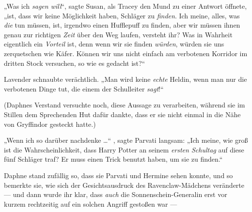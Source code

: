 „Was ich \emph{sagen will}“, sagte Susan, als Tracey den Mund zu einer Antwort öffnete, „ist, dass wir keine Möglichkeit haben, Schläger zu \emph{finden}. Ich meine, alles, was \emph{die} tun müssen, ist, irgendwo einen Hufflepuff zu finden, aber wir müssen ihnen genau zur richtigen \emph{Zeit} über den Weg laufen, versteht ihr? Was in Wahrheit eigentlich ein \emph{Vorteil} ist, denn wenn wir sie finden \emph{würden}, würden sie uns zerquetschen wie Käfer. Können wir uns nicht einfach am verbotenen Korridor im dritten Stock versuchen, so wie es gedacht ist?“

Lavender schnaubte verächtlich.
„Man wird keine \emph{echte} Heldin, wenn man nur die verbotenen Dinge tut, die einem der Schulleiter \emph{sagt}!“

(Daphnes Verstand versuchte noch, diese Aussage zu verarbeiten, während sie im Stillen dem Sprechenden Hut dafür dankte, dass er sie nicht einmal in die Nähe von Gryffindor gesteckt hatte.)

„Wenn ich so darüber nachdenke …“ , sagte Parvati langsam:
„Ich meine, wie groß ist die Wahrscheinlichkeit, dass Harry Potter an seinem \emph{ersten Schultag} auf diese fünf Schläger traf? Er muss einen Trick benutzt haben, um sie zu finden.“

Daphne stand zufällig so, dass sie Parvati und Hermine sehen konnte, und so bemerkte sie, wie sich der Gesichtsausdruck des Ravenclaw-Mädchens veränderte — und dann wurde ihr klar, dass \emph{auch} die Sonnenschein-Generalin erst vor kurzem rechtzeitig auf ein solchen Angriff gestoßen war —

